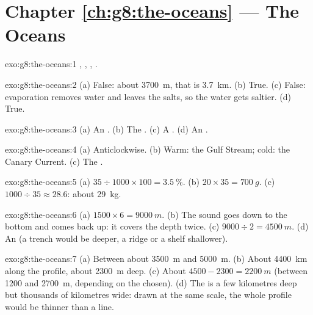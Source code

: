 \section*{Chapter \ref{ch:g8:the-oceans} --- The Oceans}

\begin{solution}{exo:g8:the-oceans:1}
, , , .
\end{solution}

\begin{solution}{exo:g8:the-oceans:2}
(a) False: about \qty{3700}{m}, that is \qty{3.7}{km}. (b) True. (c)
False: evaporation removes water and leaves the salts, so the water gets
saltier. (d) True.
\end{solution}

\begin{solution}{exo:g8:the-oceans:3}
(a) An . (b) The . (c) A . (d) An .
\end{solution}

\begin{solution}{exo:g8:the-oceans:4}
(a) Anticlockwise. (b) Warm: the Gulf Stream; cold: the Canary Current.
(c) The .
\end{solution}

\begin{solution}{exo:g8:the-oceans:5}
(a) $35 \div 1000 \times 100 = 3.5~\%$. (b) $20 \times 35 = \qty{700}{g}$.
(c) $1000 \div 35 \approx 28.6$: about \qty{29}{kg}.
\end{solution}

\begin{solution}{exo:g8:the-oceans:6}
(a) $1500 \times 6 = \qty{9000}{m}$. (b) The sound goes down to the bottom
and comes back up: it covers the depth twice. (c) $9000 \div 2 =
\qty{4500}{m}$. (d) An  (a trench would be deeper, a ridge or
a shelf shallower).
\end{solution}

\begin{solution}{exo:g8:the-oceans:7}
(a) Between about \qty{3500}{m} and \qty{5000}{m}. (b) About \qty{4400}{km} along the profile, about \qty{2300}{m} deep. (c) About
$4500 - 2300 = \qty{2200}{m}$ (between 1200 and \qty{2700}{m}, depending
on the  chosen). (d) The  is a few kilometres deep but thousands
of kilometres wide: drawn at the same scale, the whole profile would be
thinner than a line.
\end{solution}


